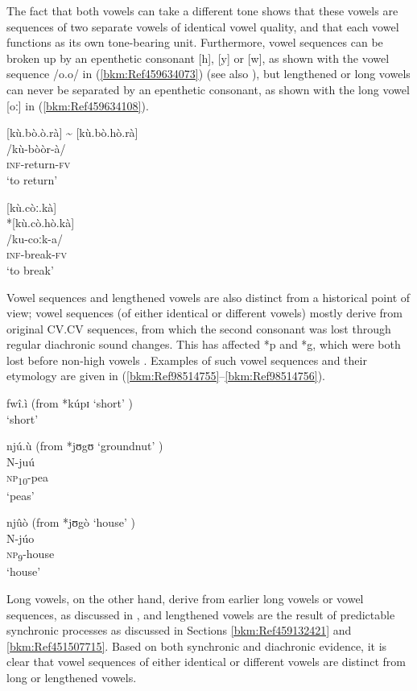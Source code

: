 The fact that both vowels can take a different tone shows that these vowels are sequences of two separate vowels of identical vowel quality, and that each vowel functions as its own tone-bearing unit. Further\-more, vowel sequences can be broken up by an epenthetic consonant [h], [y] or [w], as shown with the vowel sequence /o.o/ in (\ref{bkm:Ref459634073}) (see also ), but lengthened or long vowels can never be separated by an epenthetic consonant, as shown with the long vowel [oː] in (\ref{bkm:Ref459634108}).

\ea
\label{bkm:Ref459634073}
[kù.bò.ò.rà] {\textasciitilde} [kù.bò.hò.rà]\\
/kù-bòòr-à/\\
\textsc{inf}-return-\textsc{fv}\\
\glt ‘to return’
\z

\ea
\label{bkm:Ref459634108}
[kù.còː.kà]\\
*[kù.cò.hò.kà]\\
/ku-coːk-a/\\
\textsc{inf}-break-\textsc{fv}\\
\glt ‘to break’
\z

Vowel sequences and lengthened vowels are also distinct from a historical point of view; vowel sequences (of either identical or different vowels) mostly derive from original CV.CV sequences, from which the second consonant was lost through regular diachronic sound changes. This has affected *p and *g, which were both lost before non-high vowels \citep{Bostoen2009}. Examples of such vowel sequences and their etymology are given in (\ref{bkm:Ref98514755}--\ref{bkm:Ref98514756}).

\ea
\label{bkm:Ref98514755}
fwî.ì (from *kúpɪ ‘short’ \citep{BastinEtAl2002})\\
\glt ‘short’
\z

\ea
njú.ù (from *jʊgʊ ‘groundnut’ \citep{BastinEtAl2002})\\
N-juú\\
\textsc{np}\textsubscript{10}-pea\\
\glt ‘peas’
\z

\ea
\label{bkm:Ref98514756}
njûò (from *jʊgò ‘house’ \citep{BastinEtAl2002})\\
N-júo\\
\textsc{np}\textsubscript{9}-house\\
\glt ‘house’
\z

Long vowels, on the other hand, derive from earlier long vowels or vowel sequences, as discussed in , and length\-ened vowels are the result of predictable synchronic processes as discussed in Sections \ref{bkm:Ref459132421} and \ref{bkm:Ref451507715}. Based on both synchronic and diachronic evidence, it is clear that vowel sequences of either identical or different vowels are distinct from long or lengthened vowels.

